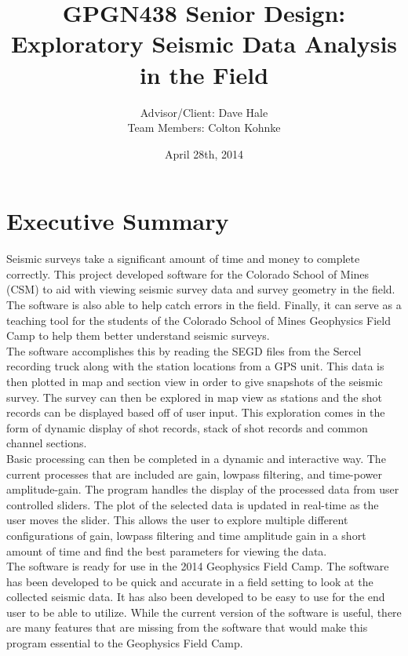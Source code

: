 \documentclass[12pt]{article}
\author{Advisor/Client: Dave Hale \\ Team Members: Colton Kohnke}
\title{GPGN438 Senior Design: \\ Exploratory Seismic Data Analysis in the Field}
\date{April 28th, 2014}
\begin{document}
\maketitle
\newpage

\section{Executive Summary}

Seismic surveys take a significant amount of time and money to complete correctly. This project developed software for the Colorado School of Mines (CSM) to aid with viewing seismic survey data and survey geometry in the field. The software is also able to help catch errors in the field. Finally, it can serve as a teaching tool for the students of the Colorado School of Mines Geophysics Field Camp to help them better understand seismic surveys. \\

The software accomplishes this by reading the SEGD files from the Sercel recording truck along with the station locations from a GPS unit. This data is then plotted in map and section view in order to give snapshots of the seismic survey. The survey can then be explored in map view as stations and the shot records can be displayed based off of user input. This exploration comes in the form of dynamic display of shot records, stack of shot records and common channel sections.\\

Basic processing can then be completed in a dynamic and interactive way. The current processes that are included are gain, lowpass filtering, and time-power amplitude-gain. The program handles the display of the processed data from user controlled sliders. The plot of the selected data is updated in real-time as the user moves the slider. This allows the user to explore multiple different configurations of gain, lowpass filtering and time amplitude gain in a short amount of time and find the best parameters for viewing the data.\\

The software is ready for use in the 2014 Geophysics Field Camp. The software has been developed to be quick and accurate in a field setting to look at the collected seismic data. It has also been developed to be easy to use for the end user to be able to utilize. While the current version of the software is useful, there are many features that are missing from the software that would make this program essential to the Geophysics Field Camp. 
\end{document}

